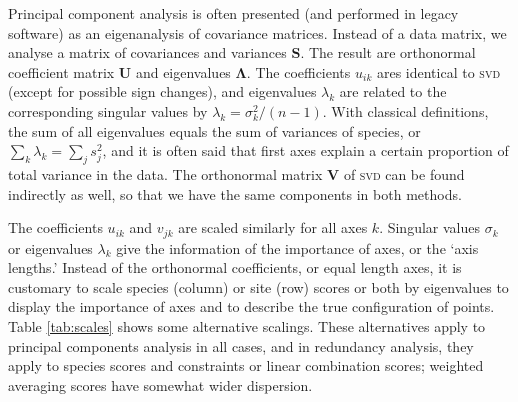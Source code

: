 \documentclass[a4paper,10pt]{amsart}
\begin{document}
Principal component analysis is often presented (and performed in
legacy software) as an eigenanalysis of covariance matrices.  Instead
of a data matrix, we analyse a matrix of covariances and variances
$\mathbf{S}$.  The result are orthonormal coefficient matrix
$\mathbf{U}$ and eigenvalues $\mathbf{\Lambda}$.  The coefficients
$u_{ik}$ ares identical to \textsc{svd} (except for possible sign
changes), and eigenvalues $\lambda_k$ are related to the corresponding
singular values by $\lambda_k = \sigma_k^2 /(n-1)$.  With classical
definitions, the sum of all eigenvalues equals the sum of variances of
species, or $\sum_k \lambda_k = \sum_j s_j^2$, and it is often said
that first axes explain a certain proportion of total variance in the
data.  The orthonormal matrix $\mathbf{V}$ of \textsc{svd} can be
found indirectly as well, so that we have the same components in both
methods.

The coefficients $u_{ik}$ and $v_{jk}$ are scaled similarly for all
axes $k$. Singular values $\sigma_k$ or eigenvalues $\lambda_k$ give
the information of the importance of axes, or the `axis lengths.'
Instead of the orthonormal coefficients, or equal length axes, it is
customary to scale species (column) or site (row) scores or both by
eigenvalues to display the importance of axes and to describe the true
configuration of points.  Table \ref{tab:scales} shows some
alternative scalings.  These alternatives apply to principal
components analysis in all cases, and in redundancy analysis, they
apply to species scores and constraints or linear combination scores;
weighted averaging scores have somewhat wider dispersion.
\end{document}
